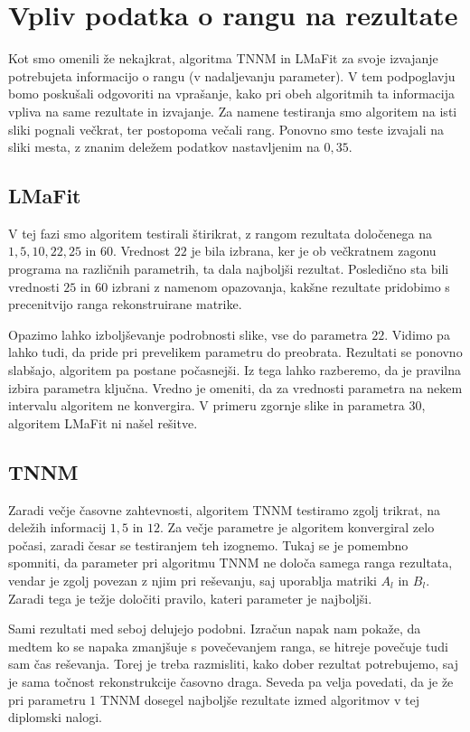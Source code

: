\section{Vpliv podatka o rangu na rezultate}
Kot smo omenili že nekajkrat, algoritma TNNM in LMaFit za svoje izvajanje potrebujeta informacijo o rangu (v nadaljevanju parameter). V tem podpoglavju bomo poskušali odgovoriti na vprašanje, kako pri obeh algoritmih ta informacija vpliva na same rezultate in izvajanje. Za namene testiranja smo algoritem na isti sliki pognali večkrat, ter postopoma večali rang. Ponovno smo teste izvajali na sliki mesta, z znanim deležem podatkov nastavljenim na $0,35$.

\subsection{LMaFit}
V tej fazi smo algoritem testirali štirikrat, z rangom rezultata določenega na
$1, 5, 10, 22, 25$ in $60$. Vrednost $22$ je bila izbrana, ker je ob večkratnem zagonu programa na različnih parametrih, ta dala najboljši rezultat. Posledično sta bili vrednosti $25$ in $60$ izbrani z namenom opazovanja, kakšne rezultate pridobimo s precenitvijo ranga rekonstruirane matrike. 


Opazimo lahko izboljševanje podrobnosti slike, vse do parametra $22$. Vidimo pa lahko tudi, da pride pri prevelikem parametru do preobrata. Rezultati se ponovno slabšajo, algoritem pa postane počasnejši. Iz tega lahko razberemo, da je pravilna izbira parametra ključna. Vredno je omeniti, da za vrednosti parametra na nekem intervalu algoritem ne konvergira. V primeru zgornje slike in parametra $30$, algoritem LMaFit ni našel rešitve. 

\subsection{TNNM}
Zaradi večje časovne zahtevnosti, algoritem TNNM testiramo zgolj trikrat, na deležih informacij $1, 5$ in $12$. Za večje parametre je algoritem konvergiral zelo počasi, zaradi česar se testiranjem teh izognemo. Tukaj se je pomembno spomniti, da parameter pri algoritmu TNNM ne določa samega ranga rezultata, vendar je zgolj povezan z njim pri reševanju, saj uporablja matriki $A_l$ in $B_l$. Zaradi tega je težje določiti pravilo, kateri parameter je najboljši.


Sami rezultati med seboj delujejo podobni. Izračun napak nam pokaže, da medtem ko se napaka zmanjšuje s povečevanjem ranga, se hitreje povečuje tudi sam čas reševanja. Torej je treba razmisliti, kako dober rezultat potrebujemo, saj je sama točnost rekonstrukcije časovno draga. Seveda pa velja povedati, da je že pri parametru $1$ TNNM dosegel najboljše rezultate izmed algoritmov v tej diplomski nalogi.

